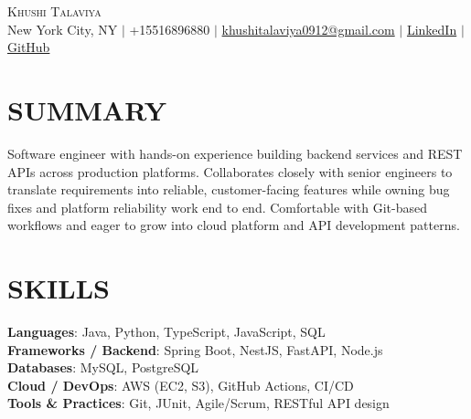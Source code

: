 \documentclass[letterpaper,11pt]{article}
\begin{document}
\begin{center}
    {\Huge \scshape Khushi Talaviya} \\ \vspace{2pt}
    \vspace{4pt}
    \small
    New York City, NY $|$
    \small
    +15516896880 $|$
    \href{mailto:khushitalaviya0912@gmail.com}{khushitalaviya0912@gmail.com} $|$
    \href{https://www.linkedin.com/in/khushitalaviya/}{LinkedIn} $|$
    \href{https://github.com/talaviyakhushi}{GitHub}
\end{center}

\section{SUMMARY}
\vspace{5pt}
\small{Software engineer with hands-on experience building backend services and REST APIs across production platforms. Collaborates closely with senior engineers to translate requirements into reliable, customer-facing features while owning bug fixes and platform reliability work end to end. Comfortable with Git-based workflows and eager to grow into cloud platform and API development patterns.}

\vspace{2pt}
\section{SKILLS}
\vspace{5pt}
\begin{itemize}[leftmargin=0in, label={}]
\small{\item{
\textbf{Languages}{: Java, Python, TypeScript, JavaScript, SQL} \\
\textbf{Frameworks / Backend}{: Spring Boot, NestJS, FastAPI, Node.js} \\
\textbf{Databases}{: MySQL, PostgreSQL} \\
\textbf{Cloud / DevOps}{: AWS (EC2, S3), GitHub Actions, CI/CD} \\
\textbf{Tools \& Practices}{: Git, JUnit, Agile/Scrum, RESTful API design}
}}
\end{itemize}
\vspace{-10pt}

\end{document}

